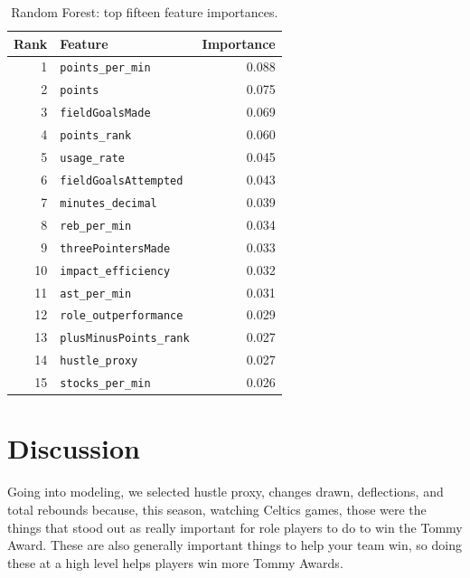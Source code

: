 \documentclass[11pt]{article}
\begin{document}
{\footnotesize
\setlength{\tabcolsep}{5pt}
\renewcommand{\arraystretch}{1.1}
\begin{table}[htbp]
  \centering
  \caption{Random Forest: top fifteen feature importances.}\label{tab:fi}
  \begin{tabular}{@{}r l r@{}}
    \toprule
    \textbf{Rank} & \textbf{Feature} & \textbf{Importance} \\
    \midrule
    1 & \texttt{points\_per\_min} & 0.088 \\
    2 & \texttt{points} & 0.075 \\
    3 & \texttt{fieldGoalsMade} & 0.069 \\
    4 & \texttt{points\_rank} & 0.060 \\
    5 & \texttt{usage\_rate} & 0.045 \\
    6 & \texttt{fieldGoalsAttempted} & 0.043 \\
    7 & \texttt{minutes\_decimal} & 0.039 \\
    8 & \texttt{reb\_per\_min} & 0.034 \\
    9 & \texttt{threePointersMade} & 0.033 \\
    10 & \texttt{impact\_efficiency} & 0.032 \\
    11 & \texttt{ast\_per\_min} & 0.031 \\
    12 & \texttt{role\_outperformance} & 0.029 \\
    13 & \texttt{plusMinusPoints\_rank} & 0.027 \\
    14 & \texttt{hustle\_proxy} & 0.027 \\
    15 & \texttt{stocks\_per\_min} & 0.026 \\
    \bottomrule
  \end{tabular}
\end{table}
}

\section{Discussion}

Going into modeling, we selected hustle proxy, changes drawn, deflections, and total rebounds because, this season, watching Celtics games, those were the things that stood out as really important for role players to do to win the Tommy Award. These are also generally important things to help your team win, so doing these at a high level helps players win more Tommy Awards. 
\end{document}
